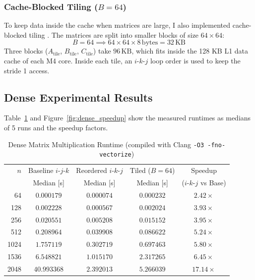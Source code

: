 \documentclass[10pt,conference,a4paper]{IEEEtran}
\begin{document}
\subsubsection{\texorpdfstring{Cache-Blocked Tiling ($B=64$)}{Cache-Blocked Tiling (B=64)}}
To keep data inside the cache when matrices are large, I also implemented cache-blocked tiling \cite{hennessy2025}. 
The matrices are split into smaller blocks of size $64 \times 64$:
\begin{equation}
B = 64 \implies 64 \times 64 \times 8\,\text{bytes} = 32\,\text{KB}
\end{equation}
Three blocks ($A_{\text{tile}}$, $B_{\text{tile}}$, $C_{\text{tile}}$) take $96\,\text{KB}$, which fits inside the 128 KB L1 data cache of each M4 core. 
Inside each tile, an $i\text{-}k\text{-}j$ loop order is used to keep the stride 1 access.

\subsection{Dense Experimental Results}
Table~\ref{tab:dense_results} and Figure~\ref{fig:dense_speedup} show the measured runtimes as medians of 5 runs and the speedup factors.

\begin{table}[t]
\centering
\caption{Dense Matrix Multiplication Runtime (compiled with Clang \texttt{-O3 -fno-vectorize})}
\label{tab:dense_results}
\setlength{\tabcolsep}{3.2pt}
\footnotesize
\begin{tabular}{r ccc c}
\toprule
$n$ & Baseline $i\text{-}j\text{-}k$ & Reordered $i\text{-}k\text{-}j$ & Tiled ($B=64$) & Speedup \\
    & Median [s] & Median [s] & Median [s] & ($i\text{-}k\text{-}j$ vs Base) \\
\midrule
64   & $0.000179$ & $0.000074$ & $0.000232$ & $2.42\times$ \\
128  & $0.002228$ & $0.000567$ & $0.002024$ & $3.93\times$ \\
256  & $0.020551$ & $0.005208$ & $0.015152$ & $3.95\times$ \\
512  & $0.208964$ & $0.039908$ & $0.086622$ & $5.24\times$ \\
1024 & $1.757119$ & $0.302719$ & $0.697463$ & $5.80\times$ \\
1536 & $6.548821$ & $1.015170$ & $2.317265$ & $6.45\times$ \\
2048 & $40.993368$ & $2.392013$ & $5.266039$ & $\mathbf{17.14\times}$ \\
\bottomrule
\end{tabular}
\end{table}
\end{document}
